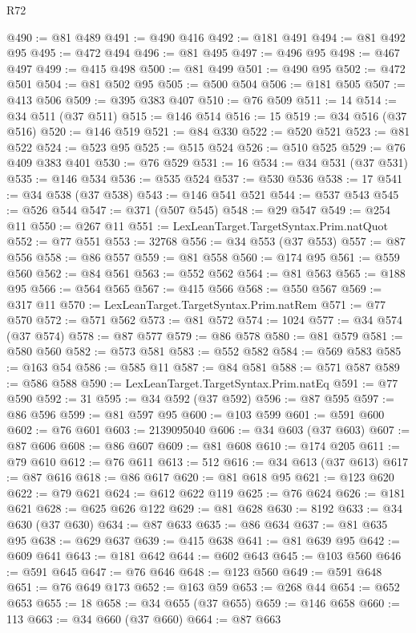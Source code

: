 \begin{lexlean}{R72}
\begin{coremodule}
@490 := @81 @489
@491 := @490 @416
@492 := @181 @491
@494 := @81 @492 @95
@495 := @472 @494
@496 := @81 @495
@497 := @496 @95
@498 := @467 @497
@499 := @415 @498
@500 := @81 @499
@501 := @490 @95
@502 := @472 @501
@504 := @81 @502 @95
@505 := @500 @504
@506 := @181 @505
@507 := @413 @506
@509 := @395 @383 @407
@510 := @76 @509
@511 := 14
@514 := @34 @511 (@37 @511)
@515 := @146 @514
@516 := 15
@519 := @34 @516 (@37 @516)
@520 := @146 @519
@521 := @84 @330
@522 := @520 @521
@523 := @81 @522
@524 := @523 @95
@525 := @515 @524
@526 := @510 @525
@529 := @76 @409 @383 @401
@530 := @76 @529
@531 := 16
@534 := @34 @531 (@37 @531)
@535 := @146 @534
@536 := @535 @524
@537 := @530 @536
@538 := 17
@541 := @34 @538 (@37 @538)
@543 := @146 @541 @521
@544 := @537 @543
@545 := @526 @544
@547 := @371 (@507 @545)
@548 := @29 @547
@549 := @254 @11
@550 := @267 @11
@551 := LexLeanTarget.TargetSyntax.Prim.natQuot
@552 := @77 @551
@553 := 32768
@556 := @34 @553 (@37 @553)
@557 := @87 @556
@558 := @86 @557
@559 := @81 @558
@560 := @174 @95
@561 := @559 @560
@562 := @84 @561
@563 := @552 @562
@564 := @81 @563
@565 := @188 @95
@566 := @564 @565
@567 := @415 @566
@568 := @550 @567
@569 := @317 @11
@570 := LexLeanTarget.TargetSyntax.Prim.natRem
@571 := @77 @570
@572 := @571 @562
@573 := @81 @572
@574 := 1024
@577 := @34 @574 (@37 @574)
@578 := @87 @577
@579 := @86 @578
@580 := @81 @579
@581 := @580 @560
@582 := @573 @581
@583 := @552 @582
@584 := @569 @583
@585 := @163 @54
@586 := @585 @11
@587 := @84 @581
@588 := @571 @587
@589 := @586 @588
@590 := LexLeanTarget.TargetSyntax.Prim.natEq
@591 := @77 @590
@592 := 31
@595 := @34 @592 (@37 @592)
@596 := @87 @595
@597 := @86 @596
@599 := @81 @597 @95
@600 := @103 @599
@601 := @591 @600
@602 := @76 @601
@603 := 2139095040
@606 := @34 @603 (@37 @603)
@607 := @87 @606
@608 := @86 @607
@609 := @81 @608
@610 := @174 @205
@611 := @79 @610
@612 := @76 @611
@613 := 512
@616 := @34 @613 (@37 @613)
@617 := @87 @616
@618 := @86 @617
@620 := @81 @618 @95
@621 := @123 @620
@622 := @79 @621
@624 := @612 @622 @119
@625 := @76 @624
@626 := @181 @621
@628 := @625 @626 @122
@629 := @81 @628
@630 := 8192
@633 := @34 @630 (@37 @630)
@634 := @87 @633
@635 := @86 @634
@637 := @81 @635 @95
@638 := @629 @637
@639 := @415 @638
@641 := @81 @639 @95
@642 := @609 @641
@643 := @181 @642
@644 := @602 @643
@645 := @103 @560
@646 := @591 @645
@647 := @76 @646
@648 := @123 @560
@649 := @591 @648
@651 := @76 @649 @173
@652 := @163 @59
@653 := @268 @44
@654 := @652 @653
@655 := 18
@658 := @34 @655 (@37 @655)
@659 := @146 @658
@660 := 113
@663 := @34 @660 (@37 @660)
@664 := @87 @663

\end{coremodule}
\end{lexlean}
